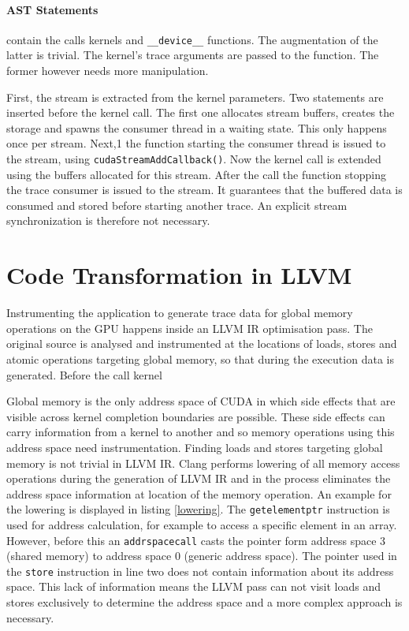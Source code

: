 \paragraph{AST Statements} contain the calls kernels and \verb|__device__| functions. The augmentation of the latter is trivial. The kernel's trace arguments are passed to the function. The former however needs more manipulation.

First, the stream is extracted from the kernel parameters. Two statements are inserted before the kernel call. The first one allocates stream buffers, creates the storage and spawns the consumer thread in a waiting state. This only happens once per stream. Next,1 the function starting the consumer thread  is issued to the stream, using \verb|cudaStreamAddCallback()|. Now the kernel call is extended using the buffers allocated for this stream. After the call the function stopping the trace consumer is issued to the stream. It guarantees that
the buffered data is consumed and stored before starting another trace.
An explicit stream synchronization is therefore not necessary.

\section{Code Transformation in LLVM}\label{impl:llvm}
Instrumenting the application to generate trace data for global memory operations on the GPU happens inside an LLVM IR optimisation pass. The original source is analysed and instrumented at the locations of loads, stores and atomic operations targeting global memory, so that during the execution data is generated. Before the call kernel

Global memory is the only address space of CUDA in which side effects that are visible across kernel completion boundaries are possible. These side effects can carry information from a kernel to another and so memory operations using this address space need instrumentation. Finding loads and stores targeting global memory is not trivial in LLVM IR. Clang performs lowering of all memory access operations during the generation of LLVM IR and in the process eliminates the address space information at location of the memory operation. An example for the lowering is displayed in listing \ref{lowering}. The \verb|getelementptr| instruction is used for address calculation, for example to access a specific element in an array. However, before this an \verb|addrspacecall| casts the pointer form address space 3 (shared memory) to address space 0 (generic address space). The pointer used in the \verb|store| instruction in line two does not contain information about its address space. This lack of information means the LLVM pass can not visit loads and stores exclusively to determine the address space and a more complex approach is necessary.
 
